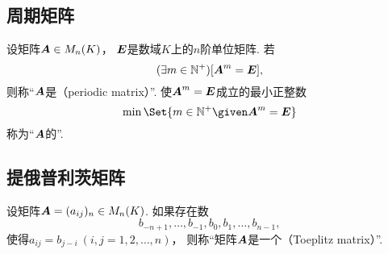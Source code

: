\subsection{周期矩阵}
\begin{definition}
设矩阵\(\boldsymbol{A} \in M_n(K)\)，
\(\boldsymbol{E}\)是数域\(K\)上的\(n\)阶单位矩阵.
若\begin{equation*}
	(\exists m\in\mathbb{N}^+)
	[\boldsymbol{A}^m = \boldsymbol{E}],
\end{equation*}
则称“\(\boldsymbol{A}\)是（periodic matrix）”.
使\(\boldsymbol{A}^m = \boldsymbol{E}\)成立的最小正整数\begin{equation*}
	\min\Set{ m\in\mathbb{N}^+ \given \vb{A}^m = \vb{E} }
\end{equation*}称为“\(\boldsymbol{A}\)的”.
\end{definition}

\subsection{提俄普利茨矩阵}
\begin{definition}
设矩阵\(\boldsymbol{A}=(a_{ij})_n \in M_n(K)\).
如果存在数\begin{equation*}
	b_{-n+1},\dotsc,b_{-1},b_0,b_1,\dotsc,b_{n-1},
\end{equation*}
使得\(a_{ij} = b_{j-i}\ (i,j=1,2,\dotsc,n)\)，
则称“矩阵\(\boldsymbol{A}\)是一个（Toeplitz matrix）”.
\end{definition}

